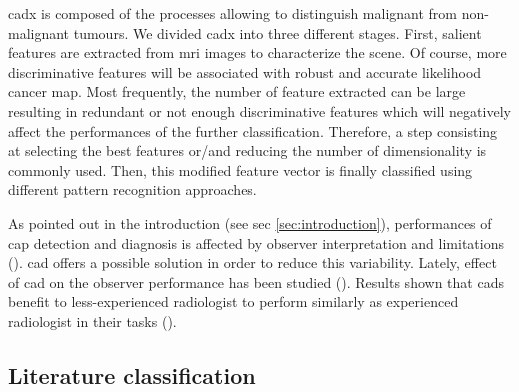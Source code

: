 \Ac{cadx} is composed of the processes allowing to distinguish malignant from non-malignant tumours. We divided \ac{cadx} into three different stages. First, salient features are extracted from \ac{mri} images to characterize the scene. Of course, more discriminative features will be associated with robust and accurate likelihood cancer map. Most frequently, the number of feature extracted can be large resulting in redundant or not enough discriminative features which will negatively affect the performances of the further classification. Therefore, a step consisting at selecting the best features or/and reducing the number of dimensionality is commonly used. Then, this modified feature vector is finally classified using different pattern recognition approaches.

As pointed out in the introduction (see \acs{sec} \ref{sec:introduction}), performances of \ac{cap} detection and diagnosis is affected by observer interpretation and limitations (\cite{Giger2008,Hambrock2013}). \ac{cad} offers a possible solution in order to reduce this variability. Lately, effect of \ac{cad} on the observer performance has been studied (\cite{Hambrock2013}). Results shown that \acp{cad} benefit to less-experienced radiologist to perform similarly as experienced radiologist in their tasks (\cite{Hambrock2013}). 

\subsection{Literature classification}


